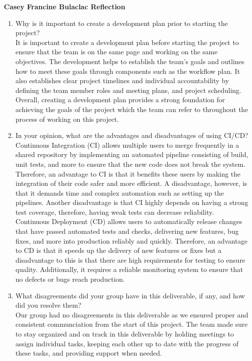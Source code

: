 \documentclass{article}
\begin{document}
\textbf{Casey Francine Bulaclac Reflection}

\begin{enumerate}
    \item Why is it important to create a development plan prior to starting the
    project? \\[1ex]
    It is important to create a development plan before starting the project to ensure that 
    the team is on the same page and working on the same objectives. The development helps to establish 
    the team's goals and outlines how to meet these goals through components such as the workflow plan. 
    It also establishes clear project timelines and individual accountability by 
    defining the team member roles and meeting plans, and project scheduling.
    Overall, creating a development plan provides a strong foundation for achieving the goals
    of the project which the team can refer to throughout the process of working on this project.
    \item In your opinion, what are the advantages and disadvantages of using CI/CD? \\[1ex]
    Continuous Integration (CI) allows multiple users to merge frequently in a shared repository by 
    implementing an automated pipeline consisting of build, unit tests, and more to 
    ensure that the new code does not break the system. Therefore, an advantage to CI is 
    that it benefits these users by making the integration of their code safer and 
    more efficient. A disadvantage, however, is that it demands time and complex automation such as 
    setting up the pipelines. Another disadvantage is that CI highly depends on having a 
    strong test coverage, therefore, having weak tests can decrease reliability. \\
    Continuous Deployment (CD) allows users to automatically release changes that have 
    passed automated tests and checks, delivering new features, bug fixes, and more into 
    production reliably and quickly. Therefore, an advantage to CD is that it speeds up 
    the delivery of new features or fixes but a disadvantage to this is that there are 
    high requirements for testing to ensure quality. Additionally, it requires a reliable 
    monitoring system to ensure that no defects or bugs reach production.

    \item What disagreements did your group have in this deliverable, if any,
    and how did you resolve them? \\[1ex]
    Our group had no disagreements in this deliverable as we ensured proper 
    and consistent communciation from the start of this project. The team made
    sure to stay organized and on track in this deliverable 
    by holding meetings to assign individual tasks, keeping each other up to date with 
    the progress of these tasks, and providing support when needed. 

\end{enumerate}
\end{document}

